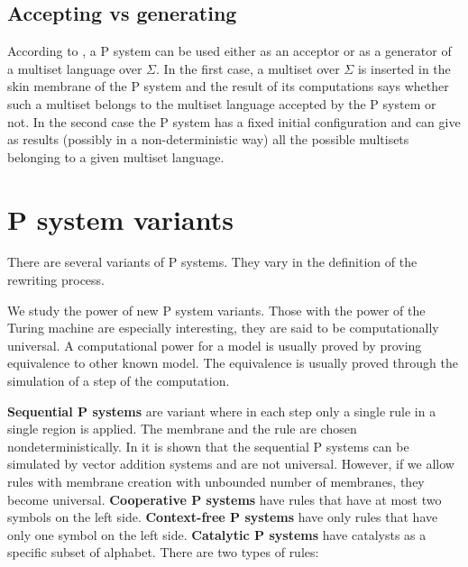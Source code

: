 \documentclass[llncs,submission,copyright,creativecommons]{../lib/lncs/llncs}
\begin{document}









\subsection{Accepting vs generating} %
\label{sub:accepting_vs_generating}
  According to \cite{Barbuti:2010:MSW:1946067.1946081}, a P system can be used either as an acceptor or as a generator of a multiset language over $\Sigma$. In the first case, a multiset over $\Sigma$ is inserted in the skin membrane of the P system and the result of its computations says whether such a multiset belongs to the multiset language accepted by the P system or not. In the second case the P system has a fixed initial configuration and can give as results (possibly in a non-deterministic way) all the possible multisets belonging to a given multiset language.


\section{P system variants}
\label{sec:variants}

There are several variants of P systems. They vary in the definition of the rewriting process.

We study the power of new P system variants. Those with the power of the Turing machine are especially interesting, they are said to be computationally universal. A computational power for a model is usually proved by proving equivalence to other known model. The equivalence is usually proved through the simulation of a step of the computation.

{\bf Sequential P systems} are variant where in each step only a single rule in a single region is applied. The membrane and the rule are chosen nondeterministically. In \cite{Ibarra:2005:SPS:2111772.2111880} it is shown that the sequential P systems can be simulated by vector addition systems and are not universal. However, if we allow rules with membrane creation with unbounded number of membranes, they become universal.
{\bf Cooperative P systems} have rules that have at most two symbols on the left side.
{\bf Context-free P systems} have only rules that have only one symbol on the left side.
{\bf Catalytic P systems} have catalysts as a specific subset of alphabet. There are two types of rules:
\end{document}
